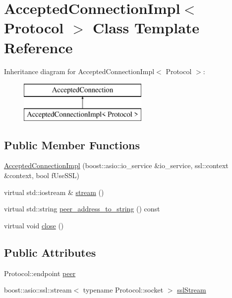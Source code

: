 \hypertarget{class_accepted_connection_impl}{}\section{Accepted\+Connection\+Impl$<$ Protocol $>$ Class Template Reference}
\label{class_accepted_connection_impl}
Inheritance diagram for Accepted\+Connection\+Impl$<$ Protocol $>$\+:\begin{figure}[H]
\begin{center}
\leavevmode
\includegraphics[height=2.000000cm]{class_accepted_connection_impl}
\end{center}
\end{figure}
\subsection*{Public Member Functions}
\begin{DoxyCompactItemize}
\item 
\hyperlink{class_accepted_connection_impl_a273b81e3d6f7706071ec71c1323c9c65}{Accepted\+Connection\+Impl} (boost\+::asio\+::io\+\_\+service \&io\+\_\+service, ssl\+::context \&context, bool f\+Use\+S\+S\+L)
\item 
virtual std\+::iostream \& \hyperlink{class_accepted_connection_impl_ab15396a413e40f947b7d527a2afe37fa}{stream} ()
\item 
virtual std\+::string \hyperlink{class_accepted_connection_impl_a5fe6c34eeec9f5c829629ae3e0539a11}{peer\+\_\+address\+\_\+to\+\_\+string} () const 
\item 
virtual void \hyperlink{class_accepted_connection_impl_a1b114863c047cae57ce42564f9a29be1}{close} ()
\end{DoxyCompactItemize}
\subsection*{Public Attributes}
\begin{DoxyCompactItemize}
\item 
Protocol\+::endpoint \hyperlink{class_accepted_connection_impl_ade939b7d2778690cf78a9f6719f47c76}{peer}
\item 
boost\+::asio\+::ssl\+::stream$<$ typename Protocol\+::socket $>$ \hyperlink{class_accepted_connection_impl_add3b600f08eabed89746393e5c319527}{ssl\+Stream}
\end{DoxyCompactItemize}


